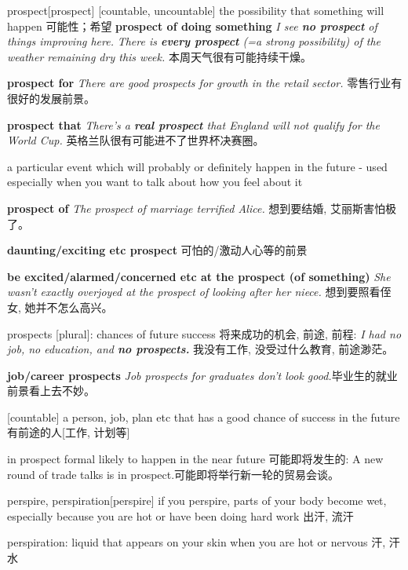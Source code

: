 \begin{DefWord}{prospect}[prospect]
    [countable, uncountable] the possibility that something will happen 可能性；希望
    \textbf{prospect of doing something}
    \textit{I see \textbf{no prospect} of things improving here.}
    \textit{There is \textbf{every prospect} (=a strong possibility) of the weather remaining dry this week.} 本周天气很有可能持续干燥。 
    
    \textbf{prospect for}
    \textit{There are good prospects for growth in the retail sector.} 零售行业有很好的发展前景。 

    \textbf{prospect that}
    \textit{There's a \textbf{real prospect} that England will not qualify for the World Cup.} 英格兰队很有可能进不了世界杯决赛圈。 

    a particular event which will probably or definitely happen in the future - used especially when you want to talk about how you feel about it

    \textbf{prospect of}
    \textit{The prospect of marriage terrified Alice.} 想到要结婚, 艾丽斯害怕极了。 
    
\textbf{daunting/exciting etc prospect} 可怕的/激动人心等的前景

\textbf{be excited/alarmed/concerned etc at the prospect (of something)}
 \textit{She wasn't exactly overjoyed at the prospect of looking after her niece.} 想到要照看侄女, 她并不怎么高兴。 

prospects [plural]: chances of future success 将来成功的机会, 前途, 前程:
 \textit{I had no job, no education, and \textbf{no prospects.}} 我没有工作, 没受过什么教育, 前途渺茫。 

\textbf{job/career prospects}
 \textit{Job prospects for graduates don't look good.}毕业生的就业前景看上去不妙。 

[countable] a person, job, plan etc that has a good chance of success in the future 有前途的人[工作, 计划等]

in prospect formal likely to happen in the near future 可能即将发生的:
 A new round of trade talks is in prospect.可能即将举行新一轮的贸易会谈。 
\end{DefWord}

\begin{DefWord}{perspire, perspiration}[perspire]
    if you perspire, parts of your body become wet, especially because you are hot or have been doing hard work 出汗, 流汗

    perspiration: liquid that appears on your skin when you are hot or nervous 汗, 汗水
\end{DefWord}

